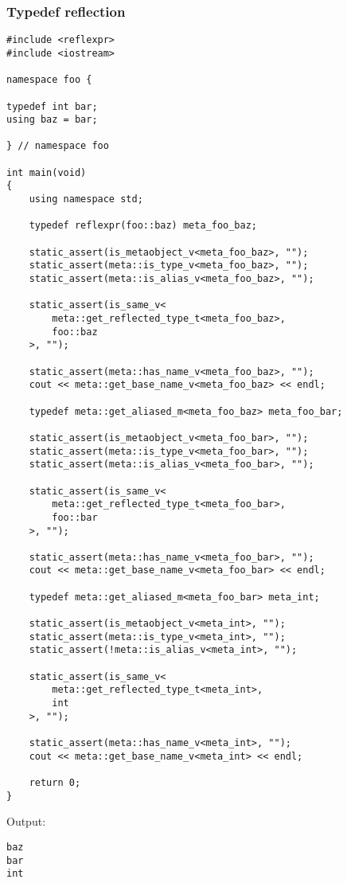 \subsubsection{Typedef reflection}

\begin{verbatim}
#include <reflexpr>
#include <iostream>

namespace foo {

typedef int bar;
using baz = bar;

} // namespace foo

int main(void)
{
	using namespace std;

	typedef reflexpr(foo::baz) meta_foo_baz;

	static_assert(is_metaobject_v<meta_foo_baz>, "");
	static_assert(meta::is_type_v<meta_foo_baz>, "");
	static_assert(meta::is_alias_v<meta_foo_baz>, "");

	static_assert(is_same_v<
		meta::get_reflected_type_t<meta_foo_baz>,
		foo::baz
	>, "");

	static_assert(meta::has_name_v<meta_foo_baz>, "");
	cout << meta::get_base_name_v<meta_foo_baz> << endl;

	typedef meta::get_aliased_m<meta_foo_baz> meta_foo_bar;

	static_assert(is_metaobject_v<meta_foo_bar>, "");
	static_assert(meta::is_type_v<meta_foo_bar>, "");
	static_assert(meta::is_alias_v<meta_foo_bar>, "");

	static_assert(is_same_v<
		meta::get_reflected_type_t<meta_foo_bar>,
		foo::bar
	>, "");

	static_assert(meta::has_name_v<meta_foo_bar>, "");
	cout << meta::get_base_name_v<meta_foo_bar> << endl;

	typedef meta::get_aliased_m<meta_foo_bar> meta_int;

	static_assert(is_metaobject_v<meta_int>, "");
	static_assert(meta::is_type_v<meta_int>, "");
	static_assert(!meta::is_alias_v<meta_int>, "");

	static_assert(is_same_v<
		meta::get_reflected_type_t<meta_int>,
		int
	>, "");

	static_assert(meta::has_name_v<meta_int>, "");
	cout << meta::get_base_name_v<meta_int> << endl;

	return 0;
}

\end{verbatim}

Output:

\begin{verbatim}
baz
bar
int
\end{verbatim}

